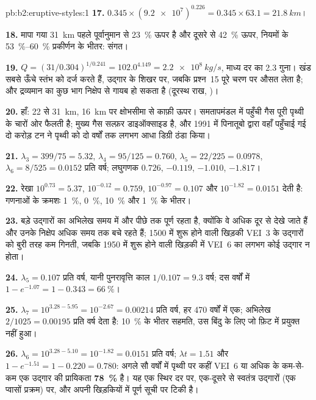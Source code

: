 \begin{solution}{pb:b2:eruptive-styles:1}
\textbf{17.} $0.345\times(\num{9.2e7})^{0.226} = 0.345\times63.1 = \qty{21.8}{km}$।

\textbf{18.} मापा गया \qty{31}{km} पहले पूर्वानुमान से \qty{23}{\percent} ऊपर है
और दूसरे से \qty{42}{\percent} ऊपर, नियमों के
\qtyrange{53}{60}{\percent} प्रकीर्णन के भीतर: संगत।

\textbf{19.} $Q = (31/0.304)^{1/0.241} = 102.0^{4.149} = \qty{2.2e8}{kg/s}$, माध्य दर का 2.3
गुना। खंड सबसे ऊँचे स्तंभ को दर्ज करते हैं, उद्गार के शिखर पर,
जबकि प्रश्न~15 पूरे चरण पर औसत लेता है; और द्रव्यमान का कुछ भाग
निक्षेप से गायब हो सकता है (दूरस्थ राख, )।

\textbf{20.} हाँ: 22 से \qty{31}{km}, \qty{16}{km} पर क्षोभसीमा से काफ़ी ऊपर।
समतापमंडल में पहुँची गैस पूरी पृथ्वी के चारों ओर फैलती है; मुख्य गैस
सल्फ़र डाइऑक्साइड है, और 1991 में पिनातूबो द्वारा वहाँ पहुँचाई गई दो करोड़ टन ने
पृथ्वी को दो वर्षों तक लगभग आधा डिग्री ठंडा किया।

\textbf{21.} $\lambda_3 = 399/75 = 5.32$, $\lambda_4 = 95/125 = 0.760$, $\lambda_5 = 22/225 =
0.0978$, $\lambda_6 = 8/525 = 0.0152$ प्रति वर्ष; लघुगणक $0.726$, $-0.119$, $-1.010$,
$-1.817$।

\textbf{22.} रेखा $10^{0.73} = 5.37$, $10^{-0.12} = 0.759$, $10^{-0.97} =
0.107$ और $10^{-1.82} = 0.0151$ देती है: गणनाओं के क्रमशः \qty{1}{\percent}, \qty{0}{\percent},
\qty{10}{\percent} और \qty{1}{\percent} के भीतर।

\textbf{23.} बड़े उद्गारों का अभिलेख समय में और पीछे तक पूर्ण रहता है,
क्योंकि वे अधिक दूर से देखे जाते हैं और उनके निक्षेप अधिक समय तक बचे रहते हैं; 1500 में
शुरू होने वाली खिड़की VEI~3 के उद्गारों को बुरी तरह कम गिनती, जबकि 1950 में
शुरू होने वाली खिड़की में VEI~6 का लगभग कोई उद्गार न होता।

\textbf{24.} $\lambda_5 = \num{0.107}$ प्रति वर्ष, यानी पुनरावृत्ति काल $1/0.107 =
\num{9.3}\text{ वर्ष}$; दस वर्षों में $1 - e^{-1.07} = 1 - 0.343 = \qty{66}{\percent}$।

\textbf{25.} $\lambda_7 = 10^{3.28 - 5.95} = 10^{-2.67} = 0.00214$ प्रति वर्ष, हर
470 वर्षों में एक; अभिलेख $2/1025 = 0.00195$ प्रति वर्ष देता है: \qty{10}{\percent} के भीतर
सहमति, उस बिंदु के लिए जो फ़िट में प्रयुक्त नहीं हुआ।

\textbf{26.} $\lambda_6 = 10^{3.28 - 5.10} = 10^{-1.82} = 0.0151$ प्रति वर्ष; $\lambda t = 1.51$
और $1 - e^{-1.51} = 1 - 0.220 = 0.780$: अगले सौ वर्षों में पृथ्वी पर कहीं
VEI~6 या अधिक के कम-से-कम एक उद्गार की प्रायिकता
\textbf{\qty[text-series-to-math=true]{78}{\percent}} है। यह एक स्थिर दर पर,
एक-दूसरे से स्वतंत्र उद्गारों (एक प्वासों प्रक्रम) पर, और अपनी खिड़कियों में
पूर्ण सूची पर टिकी है।
\end{solution}
